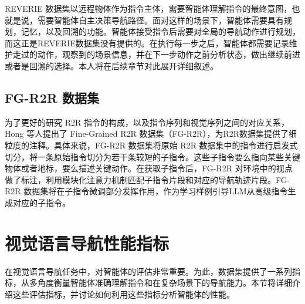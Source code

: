 \documentclass[bachelor]{thesis-uestc}
\begin{document}
REVERIE 数据集以远程物体作为指令主体，需要智能体理解指令的最终意图，也就是说，需要智能体自主决策导航路径。面对这样的场景下，智能体需要具有规划，记忆，以及回溯的功能。智能体接受指令后需要对全局的导航动作进行规划，而这正是REVERIE数据集没有提供的。在执行每一步之后，智能体都需要记录维护走过的动作，观察到的场景信息，并在下一步动作之前分析状态，做出继续前进或者是回溯的选择。本人将在后续章节对此展开详细叙述。

\subsection{FG-R2R 数据集}
为了更好的研究 R2R 指令的构成，以及指令序列和视觉序列之间的对应关系，Hong 等人\cite{hongSubInstructionAwareVisionandLanguage2020}提出了 Fine-Grained R2R 数据集（FG-R2R），为R2R数据集提供了细粒度的注释。具体来说，FG-R2R 数据集将原始 R2R 数据集中的指令进行启发式切分，将一条原始指令切分为若干条较短的子指令。这些子指令要么指向某些关键物体或者地标，要么描述关键动作。在获取子指令后，FG-R2R 对环境中的视点做了标注，利用模块化注意力机制匹配子指令片段和对应的导航轨迹片段。FG-R2R 数据集将在子指令微调部分发挥作用，作为学习样例引导LLM从高级指令生成对应的子指令。

\section{视觉语言导航性能指标}

在视觉语言导航任务中，对智能体的评估非常重要。为此，数据集提供了一系列指标，从多角度衡量智能体准确理解指令和在复杂场景下的导航能力。本节将详细介绍这些评估指标，并讨论如何利用这些指标分析智能体的性能。
\end{document}

